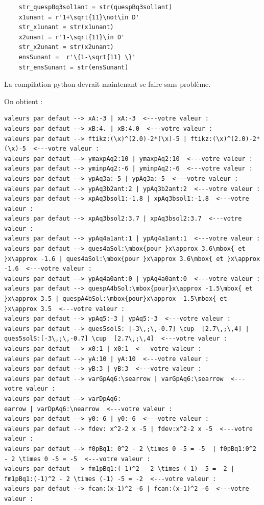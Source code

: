 {\begin{verbatim}
    str_quespBq3sol1ant = str(quespBq3sol1ant) 
    x1unant = r'1+\sqrt{11}\not\in D' 
    str_x1unant = str(x1unant) 
    x2unant = r'1-\sqrt{11}\in D' 
    str_x2unant = str(x2unant) 
    ensSunant =  r'\{1-\sqrt{11} \}' 
    str_ensSunant = str(ensSunant) 
\end{verbatim}

La compilation python devrait maintenant se faire sans problème.

 On obtient :
 {\tiny
\begin{verbatim}
valeurs par defaut --> xA:-3 | xA:-3  <---votre valeur : 
valeurs par defaut --> xB:4. | xB:4.0  <---votre valeur : 
valeurs par defaut --> ftikz:(\x)^(2.0)-2*(\x)-5 | ftikz:(\x)^(2.0)-2*(\x)-5  <---votre valeur : 
valeurs par defaut --> ymaxpAq2:10 | ymaxpAq2:10  <---votre valeur : 
valeurs par defaut --> yminpAq2:-6 | yminpAq2:-6  <---votre valeur : 
valeurs par defaut --> ypAq3a:-5 | ypAq3a:-5  <---votre valeur : 
valeurs par defaut --> ypAq3b2ant:2 | ypAq3b2ant:2  <---votre valeur : 
valeurs par defaut --> xpAq3bsol1:-1.8 | xpAq3bsol1:-1.8  <---votre valeur : 
valeurs par defaut --> xpAq3bsol2:3.7 | xpAq3bsol2:3.7  <---votre valeur : 
valeurs par defaut --> ypAq4a1ant:1 | ypAq4a1ant:1  <---votre valeur : 
valeurs par defaut --> ques4aSol:\mbox{pour }x\approx 3.6\mbox{ et }x\approx -1.6 | ques4aSol:\mbox{pour }x\approx 3.6\mbox{ et }x\approx -1.6  <---votre valeur : 
valeurs par defaut --> ypAq4a0ant:0 | ypAq4a0ant:0  <---votre valeur : 
valeurs par defaut --> quespA4bSol:\mbox{pour}x\approx -1.5\mbox{ et }x\approx 3.5 | quespA4bSol:\mbox{pour}x\approx -1.5\mbox{ et }x\approx 3.5  <---votre valeur : 
valeurs par defaut --> ypAq5:-3 | ypAq5:-3  <---votre valeur : 
valeurs par defaut --> ques5solS: [-3\,;\,-0.7] \cup  [2.7\,;\,4] | ques5solS:[-3\,;\,-0.7] \cup  [2.7\,;\,4]  <---votre valeur : 
valeurs par defaut --> x0:1 | x0:1  <---votre valeur : 
valeurs par defaut --> yA:10 | yA:10  <---votre valeur : 
valeurs par defaut --> yB:3 | yB:3  <---votre valeur : 
valeurs par defaut --> varGpAq6:\searrow | varGpAq6:\searrow  <---votre valeur : 
valeurs par defaut --> varDpAq6:
earrow | varDpAq6:\nearrow  <---votre valeur : 
valeurs par defaut --> y0:-6 | y0:-6  <---votre valeur : 
valeurs par defaut --> fdev: x^2-2 x -5 | fdev:x^2-2 x -5  <---votre valeur : 
valeurs par defaut --> f0pBq1: 0^2 - 2 \times 0 -5 = -5  | f0pBq1:0^2 - 2 \times 0 -5 = -5  <---votre valeur : 
valeurs par defaut --> fm1pBq1:(-1)^2 - 2 \times (-1) -5 = -2 | fm1pBq1:(-1)^2 - 2 \times (-1) -5 = -2  <---votre valeur : 
valeurs par defaut --> fcan:(x-1)^2 -6 | fcan:(x-1)^2 -6  <---votre valeur : 

\end{verbatim}}}
